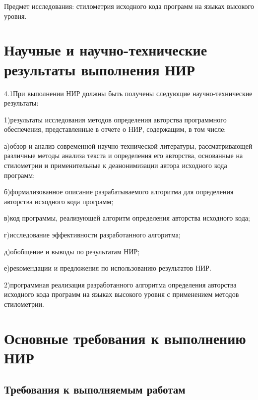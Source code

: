 Предмет исследования: стилометрия исходного кода программ на языках высокого уровня.   

\section{Научные и научно-технические результаты выполнения НИР}

4.1\hspace{5mm}При выполнении НИР должны быть получены следующие научно-технические результаты:

1)\hspace{5mm}результаты исследования методов определения авторства программного обеспечения, представленные в отчете о НИР, содержащим, в том числе:

а)\hspace{5mm}обзор и анализ современной научно-технической литературы, рассматривающей различные методы анализа текста и определения его авторства, основанные на стилометрии и применительные к деанонимизации автора исходного кода программ;

б)\hspace{5mm}формализованное описание разрабатываемого алгоритма для определения авторства исходного кода программ;

в)\hspace{5mm}код программы, реализующей алгоритм определения авторства исходного кода;

г)\hspace{5mm}исследование эффективности разработанного алгоритма;

д)\hspace{5mm}обобщение и выводы по результатам НИР;

е)\hspace{5mm}рекомендации и предложения по использованию результатов НИР.

2)\hspace{5mm}программная реализация разработанного алгоритма определения авторства исходного кода программ на языках высокого уровня с применением методов стилометрии.

\section{Основные требования к выполнению НИР}
\subsection{Требования к выполняемым работам}

